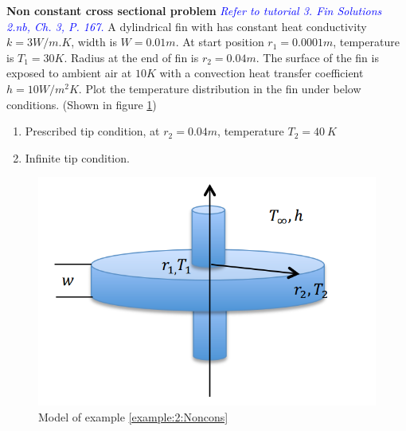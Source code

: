 \begin{example}
\label{example:2:Noncons}
\textbf{Non constant cross sectional problem}
\textcolor{blue} {\emph{Refer to tutorial 3.  Fin Solutions 2.nb, Ch. 3, P. 167.}}
A dylindrical fin with has constant heat conductivity  $k=3W/m.K$, width is
$W=0.01m$. At start position $r_1=0.0001m$, temperature is $T_1=30K$. Radius at
the end of fin is $r_2=0.04m$. The surface of the fin is exposed to ambient air at
$10K$ with a convection heat transfer coefficient $h=10W/m^2K$.
Plot the temperature distribution in the fin under below conditions. (Shown in figure \ref{fig:2:16})

\begin{enumerate}
\item Prescribed tip condition, at $r_2=0.04m$, temperature $T_2=40~K$
\item Infinite tip condition.
\end{enumerate}
\begin{figure}[H]
  \centering
    \includegraphics[scale=0.4]{figures/ch2/16}
    \caption{Model of example \ref{example:2:Noncons}}
    \label{fig:2:16}
\end{figure}
\end{example}

